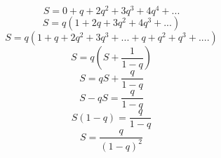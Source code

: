 \documentclass{article}
\begin{document}
	\begin{equation}
	S = 0 + q + 2q^2 + 3q^3 + 4q^4 + ...
	\end{equation}
	\begin{equation}
	S = q(1 + 2q + 3q^2 + 4q^3 + ...)
	\end{equation}
	\begin{equation}
	S = q(1 + q + 2q^2 + 3q^3 + ... + q + q^2 + q^3 + ....)
	\end{equation}
	\begin{equation}
	S = q(S + \frac{1}{1 - q})
	\end{equation}
	\begin{equation}
	S = qS + \frac{q}{1 - q}
	\end{equation}
	\begin{equation}
	S - qS = \frac{q}{1 - q}
	\end{equation}
	\begin{equation}
	S(1 - q) = \frac{q}{1 - q}
	\end{equation}
	\begin{equation}
	S = \frac{q}{(1 - q)^2}
	\end{equation}
\end{document}
